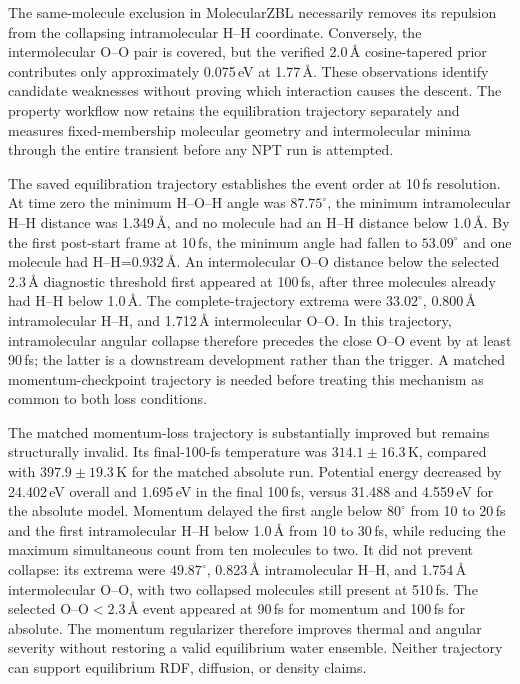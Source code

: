 \documentclass[11pt]{article}
\begin{document}
The same-molecule exclusion in MolecularZBL necessarily removes its
repulsion from the collapsing intramolecular H--H coordinate. Conversely,
the intermolecular O--O pair is covered, but the verified 2.0\,\AA{}
cosine-tapered prior contributes only approximately 0.075\,eV at
1.77\,\AA. These observations identify candidate weaknesses without proving
which interaction causes the descent. The property workflow now retains the
equilibration trajectory separately and measures fixed-membership molecular
geometry and intermolecular minima through the entire transient before any
NPT run is attempted.

The saved equilibration trajectory establishes the event order at 10\,fs
resolution. At time zero the minimum H--O--H angle was $87.75^\circ$, the
minimum intramolecular H--H distance was 1.349\,\AA, and no molecule had an
H--H distance below 1.0\,\AA. By the first post-start frame at 10\,fs, the
minimum angle had fallen to $53.09^\circ$ and one molecule had
H--H=0.932\,\AA. An intermolecular O--O distance below the selected 2.3\,\AA{}
diagnostic threshold first appeared at 100\,fs, after three molecules already
had H--H below 1.0\,\AA. The complete-trajectory extrema were
$33.02^\circ$, 0.800\,\AA{} intramolecular H--H, and 1.712\,\AA{}
intermolecular O--O. In this trajectory, intramolecular angular collapse
therefore precedes the close O--O event by at least 90\,fs; the latter is a
downstream development rather than the trigger. A matched momentum-checkpoint
trajectory is needed before treating this mechanism as common to both loss
conditions.

The matched momentum-loss trajectory is substantially improved but remains
structurally invalid. Its final-100-fs temperature was
$314.1\pm16.3$\,K, compared with $397.9\pm19.3$\,K for the matched absolute
run. Potential energy decreased by 24.402\,eV overall and 1.695\,eV in the
final 100\,fs, versus 31.488 and 4.559\,eV for the absolute model. Momentum
delayed the first angle below $80^\circ$ from 10 to 20\,fs and the first
intramolecular H--H below 1.0\,\AA{} from 10 to 30\,fs, while reducing the
maximum simultaneous count from ten molecules to two. It did not prevent
collapse: its extrema were $49.87^\circ$, 0.823\,\AA{} intramolecular H--H,
and 1.754\,\AA{} intermolecular O--O, with two collapsed molecules still
present at 510\,fs. The selected O--O$<2.3$\,\AA{} event appeared at 90\,fs
for momentum and 100\,fs for absolute. The momentum regularizer therefore
improves thermal and angular severity without restoring a valid equilibrium
water ensemble. Neither trajectory can support equilibrium RDF, diffusion,
or density claims.
\end{document}
